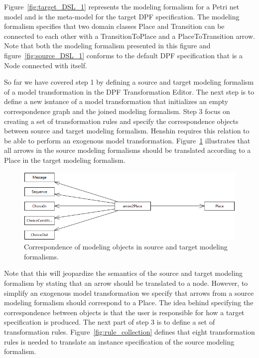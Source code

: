 Figure~\ref{fig:target_DSL_1} represents the modeling formalism for a
Petri net model and is the meta-model for the target DPF specification. The
modeling formalism specifies that two domain classes Place and Transition can
be connected to each other with a TransitionToPlace and a PlaceToTransition
arrow. Note that both the modeling formalism presented in this figure and
figure~\ref{fig:source_DSL_1} conforms to the default DPF specification that is
a Node connected with itself.

So far we have covered step 1 by defining a source and target modeling formalism
of a model transformation in the DPF Transformation Editor. The next step is to
define a new isntance of a model transformation that initializes an empty
correspondence graph and the joined modeling formalism. Step 3 focus on creating
a set of transformation rules and specify the correspondence objects between
source and target modeling formalism. Henshin requires this relation to be able
to perform an exogenous model transformation.
Figure~\ref{fig:correspondence_arrow} illustrates that all arrows in the source
modeling formalisms should be translated according to a Place in the target
modeling formalism.

\begin{figure}[H]
	\centering
	\includegraphics[scale=0.6]{./Figures/correspondenceObjects.png}
	\caption[Simplified joined specification]
	{Correspondence of modeling objects in source and target modeling formalisms.}
	\label{fig:correspondence_arrow}
\end{figure}

Note that this will jeopardize the semantics of the source and target modeling
formalism by stating that an arrow should be translated to a node. However, to
simplify an exogenous model transformation we specify that arrows from a source
modeling formalism should correspond to a Place. The idea behind specifying the
correspondence between objects is that the user is responsible for how a target
specification is produced. The next part of step 3 is to define a set of
transformation rules. Figure~\ref{fig:rule_collection} defines that eight
transformation rules is needed to translate an instance specification of the
source modeling formalism. 

